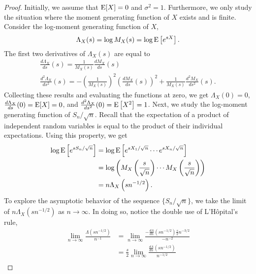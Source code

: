 \begin{proof}
Initially, we assume that $\mathrm{E} [X] = 0$ and $\sigma^2 = 1$.
Furthermore, we only study the situation where the moment generating function of $X$ exists and is finite.
Consider the log-moment generating function of $X$,
\begin{equation*}
\Lambda_X (s) = \log M_X (s)
= \log \mathrm{E} \left[ e^{sX} \right] .
\end{equation*}
The first two derivatives of $\Lambda_X (s)$ are equal to
\begin{gather*}
\frac{d \Lambda_X}{ds} (s)
= \frac{1}{M_X (s)} \frac{d M_X}{ds} (s) \\
\frac{d^2 \Lambda_X}{ds^2} (s)
= - \left( \frac{1}{M_X (s)} \right)^2 \left( \frac{d M_X}{ds} (s) \right)^2
+ \frac{1}{M_X (s)} \frac{d^2 M_X}{ds^2} (s) .
\end{gather*}
Collecting these results and evaluating the functions at zero, we get $\Lambda_X (0) = 0$, $\frac{d \Lambda_X}{ds} (0) = \mathrm{E} [X] = 0$, and $\frac{d^2 \Lambda_X}{ds^2} (0) = \mathrm{E} \left[ X^2 \right] = 1$.
Next, we study the log-moment generating function of $S_n / \sqrt{n}$.
Recall that the expectation of a product of independent random variables is equal to the product of their individual expectations.
Using this property, we get
\begin{equation*}
\begin{split}
\log \mathrm{E} \left[ e^{s S_n / \sqrt{n} } \right]
&= \log \mathrm{E} \left[ e^{s X_1 / \sqrt{n} }
\cdots e^{s X_n / \sqrt{n} } \right] \\
&= \log \left( M_X \left( \frac{s}{\sqrt{n}} \right)
\cdots M_X \left( \frac{s}{\sqrt{n}} \right) \right) \\
&= n \Lambda_X \left( s n^{-1/2} \right) .
\end{split}
\end{equation*}
To explore the asymptotic behavior of the sequence $\{ S_n / \sqrt{n} \}$, we take the limit of $n \Lambda_X \left( s n^{-1/2} \right)$ as $n \rightarrow \infty$.
In doing so, notice the double use of L'H\^{o}pital's rule,
\begin{equation*}
\begin{split}
\lim_{n \rightarrow \infty} \frac{\Lambda \left( s n^{-1/2} \right)}{n^{-1}}
&= \lim_{n \rightarrow \infty}
\frac{-\frac{d \Lambda}{dn} \left( s n^{-1/2} \right) \frac{s}{2} n^{-3/2}}{-n^{-2}} \\
&= \frac{s}{2} \lim_{n \rightarrow \infty}
\frac{\frac{d \Lambda}{dn} \left( s n^{-1/2} \right)}{n^{-1/2}} \\

\end{split}
\end{equation*}
\end{proof}

